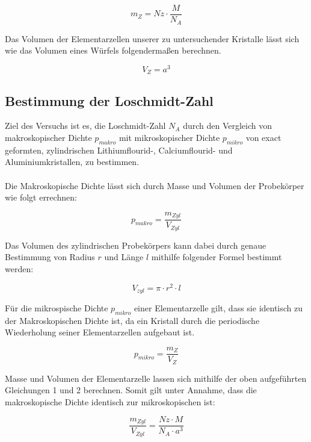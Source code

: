 \documentclass[12pt,a4paper,titlepage,headinclude,bibtotoc]{scrartcl}
\begin{document}
\begin{equation}
m_{Z}=Nz \cdot \dfrac{M}{N_{A}}
\end{equation} 

Das Volumen der Elementarzellen unserer zu untersuchender Kristalle lässt sich wie das Volumen eines Würfels folgendermaßen berechnen.

\begin{equation}
V_Z = a^3
\end{equation}


\subsection{Bestimmung der Loschmidt-Zahl}
 
Ziel des Versuchs ist es, die Loschmidt-Zahl $N_{A}$ durch den Vergleich von makroskopischer Dichte $p_{makro}$ mit mikroskopischer Dichte $p_{mikro}$ von exact geformten, zylindrischen Lithiumflourid-, Calciumflourid- und Aluminiumkristallen, zu bestimmen.\\\\

Die Makroskopische Dichte lässt sich durch  Masse und Volumen der Probekörper wie folgt errechnen:

\begin{equation}
p_{makro}= \frac{m_{Zyl}}{V_{Zyl}}
\end{equation}

Das Volumen des zylindrischen Probekörpers kann dabei durch genaue Bestimmung von Radius $r$ und Länge $l$ mithilfe folgender Formel bestimmt werden:

\begin{equation}
V_{zyl} = \pi \cdot r^{2} \cdot l
\end{equation}

Für die mikrospische Dichte $p_{mikro}$ einer Elementarzelle gilt, dass sie identisch zu der Makroskopischen Dichte ist, da ein Kristall durch die periodische Wiederholung seiner Elementarzellen aufgebaut ist.

\begin{equation}
p_{mikro}=\frac{m_Z}{V_Z}
\end{equation}

Masse und Volumen der Elementarzelle lassen sich mithilfe der oben aufgeführten Gleichungen 1 und 2 berechnen. Somit gilt unter Annahme, dass die makroskopische Dichte identisch zur mikroskopischen ist:

\begin{equation}
\frac{m_{Zyl}}{V_{Zyl}}= \frac{Nz \cdot M}{N_{A} \cdot a^3}
\end{equation}
\end{document}
